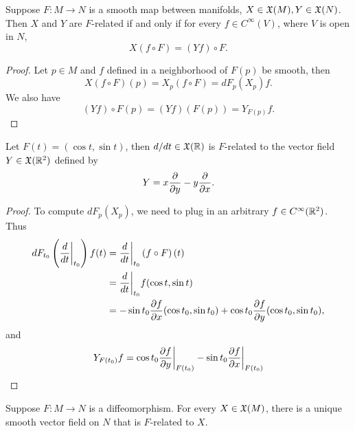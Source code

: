 \begin{proposition}
    Suppose $F:M \to N$ is a smooth map between manifolds, $X \in \frak{X}(M) ,Y \in \frak{X}(N)$. Then $X$ and $Y$ are $F$-related if and only if for every $f \in C^\infty(V)$, where $V$ is open in $N$, 
    $$ X(f \circ F) = (Yf) \circ F. $$
\end{proposition}
\begin{proof}
    Let $p \in M$ and $f$ defined in a neighborhood of $F(p)$ be smooth, then 
    $$X(f \circ F)(p) = X_p(f \circ F) = dF_p(X_p)f. $$ We also have 
    $$(Yf) \circ F(p) = (Yf)(F(p)) = Y_{F(p)}f. $$
\end{proof}
\begin{example}
    Let $F(t) = (\cos t, \sin t)$, then $d/dt \in \frak{X}(\mathbb{R})$ is $F$-related to the vector field $Y \in \frak{X}(\mathbb{R}^2)$ defined by 
    $$Y = x\pdv{}{y} - y\pdv{}{x}. $$
\end{example}
\begin{proof}
    To compute $dF_p(X_p)$, we need to plug in an arbitrary $f \in C^\infty(\mathbb{R}^2)$. Thus
    \begin{align*}
    dF_{t_0}\left(\frac{d}{dt}\bigg|_{t_0}\right)f(t) 
    &= \frac{d}{dt}\bigg|_{t_0} \left(f \circ F\right)(t) \\
    &= \frac{d}{dt}\bigg|_{t_0} f(\cos t, \sin t) \\
    &= -\sin t_0 {\pdv{f}{x}}(\cos t_0, \sin t_0) + \cos t_0{\pdv{f}{y}}(\cos t_0, \sin t_0), 
    \end{align*}
    and $$Y_{F(t_0)}f = \cos t_0 \pdv{f}{y}\bigg|_{F(t_0)} - \sin t_0 \pdv{f}{x}\bigg|_{F(t_0)} $$
\end{proof}
\begin{proposition}
    Suppose $F:M \to N$ is a diffeomorphism. For every $X \in \frak{X}(M)$, there is a unique smooth vector field on $N$ that is $F$-related to $X$. 
\end{proposition}


